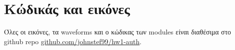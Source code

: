\documentclass[12pt]{article}
\begin{document}
\maketitle \newpage
{}
\tableofcontents \newpage






\section*{Κώδικάς και εικόνες}
Όλες οι εικόνες, τα waveforms και ο κώδικας των modules είναι διαθέσιμα στο
github repo
\href{https://github.com/johnstef99/hw1-auth}{github.com/johnstef99/hw1-auth}.
\end{document}
